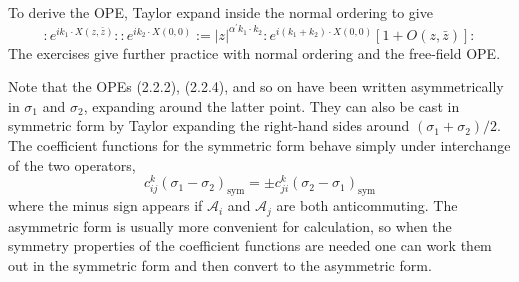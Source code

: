 To derive the OPE, Taylor expand inside the normal ordering to give
\begin{equation}
: e^{i k_{1} \cdot X(z, \bar{z})}:: e^{i k_{2} \cdot X(0,0)}:=|z|^{\alpha^{\prime} k_{1} \cdot k_{2}}: e^{i\left(k_{1}+k_{2}\right) \cdot X(0,0)}[1+O(z, \bar{z})]:
\end{equation}
The exercises give further practice with normal ordering and the free-field OPE.

Note that the OPEs (2.2.2), (2.2.4), and so on have been written asymmetrically in $\sigma_{1}$ and $\sigma_{2}$, expanding around the latter point. They can also be cast in symmetric form by Taylor expanding the right-hand sides around $\left(\sigma_{1}+\sigma_{2}\right) / 2$. The coefficient functions for the symmetric form behave simply under interchange of the two operators,
\begin{equation}
c_{i j}^{k}\left(\sigma_{1}-\sigma_{2}\right)_{\mathrm{sym}}=\pm c_{j i}^{k}\left(\sigma_{2}-\sigma_{1}\right)_{\mathrm{sym}}
\end{equation}
where the minus sign appears if $\mathscr{A}_{i}$ and $\mathscr{A}_{j}$ are both anticommuting. The asymmetric form is usually more convenient for calculation, so when the
symmetry properties of the coefficient functions are needed one can work
them out in the symmetric form and then convert to the asymmetric form.


